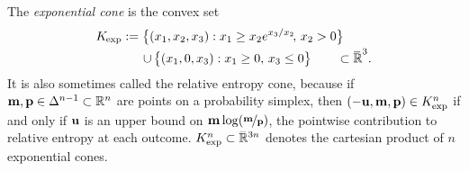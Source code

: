 \documentclass[twoside]{article}
\begin{document}
The \emph{exponential cone} is the convex set
\begin{align*}
        \begin{aligned}
        K_{\mskip-1mu\exp} :=
        \big\{ (x_1, x_2, x_3) &:
                x_1 \ge x_2 e^{x_3 / x_2}\!,\, x_2 > 0 \big\}
            \\[-0.2ex]\quad \mathbin{\cup}\,
        \big\{ (x_1, 0, x_3&) : x_1 \ge 0,\, x_3 \le 0 \big\}
        \qquad \subset \mathbb {\mskip1mu\overline{\mskip-1mu\mathbb R\!}\,}^3.
    \end{aligned}
\end{align*}
{\color{gray!50!white} It is also sometimes called the relative entropy cone, because if $\mathbf{m}, \mathbf{p} \in \Delta^{n-1} \subset \mathbb R^n$ are points on a probability simplex, then $(-\mathbf{u}, \mathbf{m}, \mathbf{p}) \in K_{\exp}^n$ if and only if $\mathbf{u}$ is an upper bound on $\mathbf{m} \log (\nicefrac{\mathbf{m}}{\mathbf{p}})$, the pointwise contribution to relative entropy at each outcome.}
%
$K_{\exp}^n \subset \smash{\mskip1mu\overline{\mskip-1mu\mathbb R\!}\,}\vphantom{R}^{3n}$ denotes the cartesian product
of $n$ exponential cones. 
\end{document}
